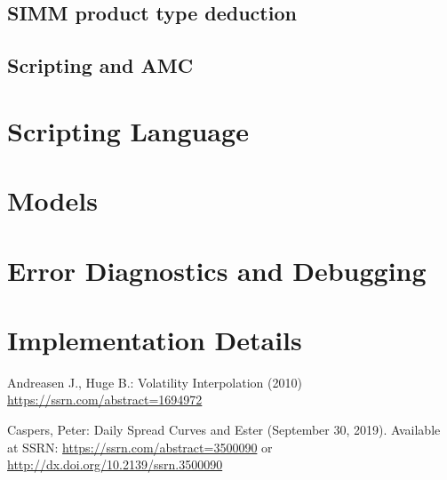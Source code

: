 \documentclass[12pt, a4paper]{article}
\begin{document}
\subsection{SIMM product type deduction}


\subsection{Scripting and AMC}\label{scripting_amc}


\section{Scripting Language}


\section{Models}


\section{Error Diagnostics and Debugging}


\section{Implementation Details}


  
\begin{thebibliography}{*}

 Andreasen J., Huge B.: Volatility Interpolation (2010) \url{https://ssrn.com/abstract=1694972}

 Caspers, Peter: Daily Spread Curves and Ester (September 30, 2019). Available at SSRN:
  \url{https://ssrn.com/abstract=3500090} or \url{http://dx.doi.org/10.2139/ssrn.3500090}



\end{thebibliography}
\end{document}
